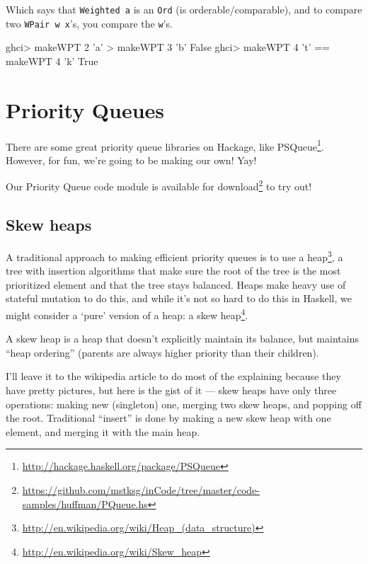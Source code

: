 \documentclass[]{article}
\newenvironment{Shaded}{}{}
\newcommand{\DataTypeTok}[1]{\textcolor[rgb]{0.56,0.13,0.00}{{#1}}}
\newcommand{\DecValTok}[1]{\textcolor[rgb]{0.25,0.63,0.44}{{#1}}}
\newcommand{\CharTok}[1]{\textcolor[rgb]{0.25,0.44,0.63}{{#1}}}
\newcommand{\FunctionTok}[1]{\textcolor[rgb]{0.02,0.16,0.49}{{#1}}}
\newcommand{\NormalTok}[1]{{#1}}
\renewcommand{\href}[2]{#2\footnote{\url{#1}}}
\begin{document}
Which says that \texttt{Weighted\ a} is an \texttt{Ord} (is
orderable/comparable), and to compare two \texttt{WPair\ w\ x}'s, you
compare the \texttt{w}'s.

\begin{Shaded}
\begin{Highlighting}[]
\NormalTok{ghci}\FunctionTok{>} \NormalTok{makeWPT }\DecValTok{2} \CharTok{'a'} \FunctionTok{>} \NormalTok{makeWPT }\DecValTok{3} \CharTok{'b'}
\DataTypeTok{False}
\NormalTok{ghci}\FunctionTok{>} \NormalTok{makeWPT }\DecValTok{4} \CharTok{'t'} \FunctionTok{==} \NormalTok{makeWPT }\DecValTok{4} \CharTok{'k'}
\DataTypeTok{True}
\end{Highlighting}
\end{Shaded}

\section{Priority Queues}\label{priority-queues}

There are some great priority queue libraries on Hackage, like
\href{http://hackage.haskell.org/package/PSQueue}{PSQueue}. However, for
fun, we're going to be making our own! Yay!

Our Priority Queue code module is
\href{https://github.com/mstksg/inCode/tree/master/code-samples/huffman/PQueue.hs}{available
for download} to try out!

\subsection{Skew heaps}\label{skew-heaps}

A traditional approach to making efficient priority queues is to use a
\href{http://en.wikipedia.org/wiki/Heap_(data_structure)}{heap}, a tree
with insertion algorithms that make sure the root of the tree is the
most prioritized element and that the tree stays balanced. Heaps make
heavy use of stateful mutation to do this, and while it's not so hard to
do this in Haskell, we might consider a `pure' version of a heap: a
\href{http://en.wikipedia.org/wiki/Skew_heap}{skew heap}.

A skew heap is a heap that doesn't explicitly maintain its balance, but
maintains ``heap ordering'' (parents are always higher priority than
their children).

I'll leave it to the wikipedia article to do most of the explaining
because they have pretty pictures, but here is the gist of it --- skew
heaps have only three operations: making new (singleton) one, merging
two skew heaps, and popping off the root. Traditional ``insert'' is done
by making a new skew heap with one element, and merging it with the main
heap.
\end{document}
